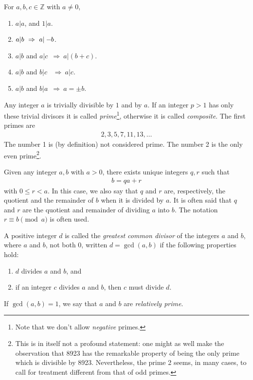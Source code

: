 \documentclass[a4paper, 12pt]{book} %
\begin{document}
\begin{theorem}
    For $a, b, c \in \mathbb{Z}$ with $a \neq 0$,
    \begin{enumerate}
        \item $a|a$, and $1|a$.
        \item $a|b~\Rightarrow~a|-\hspace{-1mm}b$.
        \item $a|b$ and $a|c$~$\Rightarrow~a|(b+c)$.
        \item $a|b$ and $b|c$ ~$\Rightarrow~a|c$.
        \item $a|b$ and $b|a$~$\Rightarrow~a = \pm b$.
    \end{enumerate}
\end{theorem}

Any integer $a$ is trivially divisible by $1$ and by $a$. If an integer $p > 1$  has only these trivial divisors it is called \emph{prime}\footnote{Note that we don't allow \emph{negative} primes.}, otherwise it is called \emph{composite}. The first  primes are 
\begin{align}
    2, 3, 5, 7, 11, 13, \ldots
\end{align}
The number 1 is (by definition) not considered prime. The number 2 is the only even prime\footnote{This is in itself not a profound statement: one might as well make the observation that 8923 has the remarkable property of being the only prime which is divisible by 8923. Nevertheless, the prime 2 seems, in many cases, to call for treatment different from that of odd primes.}.

\begin{theorem}
    Given any integer $a, b$ with $a > 0$, there exists unique integers $q, r$ such that 
    \begin{align}
        b = qa + r
    \end{align}
    with $0 \leq r < a$. In this case, we also say that $q$ and $r$ are, respectively, the quotient and the remainder of $b$ when it is divided by $a$. It is often said that $q$ and $r$ are the quotient and remainder of dividing $a$ into $b$. The notation $r \equiv b \pmod a$ is often used.
\end{theorem}


\begin{definition}
    A positive integer $d$ is called the \emph{greatest common divisor} of the integers $a$ and $b$, where $a$ and $b$, not both 0, written $d = \gcd(a, b)$ if the following properties hold:
    \begin{enumerate}
        \item $d$ divides $a$ and $b$, and
        \item if an integer $c$ divides $a$ and $b$, then $c$ must divide $d$.
    \end{enumerate}
    If $\gcd(a, b) = 1$, we say that $a$ and $b$ are \emph{relatively prime}.
\end{definition}
\end{document}
